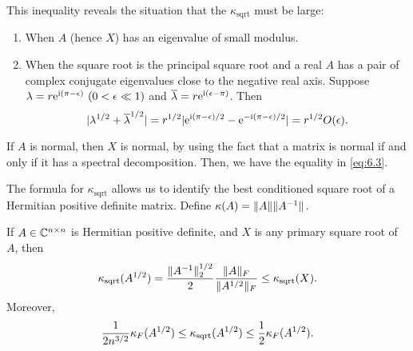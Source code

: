 \documentclass{article}
\begin{document}
This inequality reveals the situation that the $\kappa_{\mathrm{sqrt}}$
must be large:
\begin{enumerate}
\item When $A$ (hence $X$) has an eigenvalue of small modulus.
\item When the square root is the principal square root and a real $A$ has
  a pair of complex conjugate eigenvalues close to the negative real axis.
  Suppose $\lambda = r\mathrm{e}^{\mathrm{i}(\pi - \epsilon)}\ (0<\epsilon\ll 1)$ and
  $\overline \lambda = r\mathrm{e}^{\mathrm{i}(\epsilon - \pi)}$. Then
  \begin{equation}\label{eq:6.3}
    |\lambda^{1/2} + \overline\lambda^{1/2}| =
    r^{1/2}|\mathrm{e}^{\mathrm{i}(\pi-\epsilon)/2} - \mathrm{e}^{-\mathrm{i}(\pi-\epsilon)/2}| =
    r^{1/2}O(\epsilon). 
  \end{equation}
\end{enumerate}

If $A$ is normal, then $X$ is normal, by using the fact that a matrix is
normal if and only if it has a spectral decomposition. Then, we have the
equality in \eqref{eq:6.3}.

The formula for $\kappa_{\mathrm{sqrt}}$ allows us to identify the best
conditioned square root of a Hermitian positive definite matrix. Define
$\kappa(A) = \|{A}\|\|{A^{-1}}\|$.

\begin{lemma}
  If $A\in\mathbb{C}^{n\times n}$ is Hermitian positive definite, and $X$ is any primary
  square root of $A$, then
  \begin{equation}\notag
    \kappa_{\mathrm{sqrt}}(A^{1/2}) =
    \frac{\|{A^{-1}}\|_2^{1/2}}{2}\frac{\|{A}\|_F}{\|{A^{1/2}}\|_F} \leq
    \kappa_{\mathrm{sqrt}}(X). 
  \end{equation}
  Moreover,
  \begin{equation}\notag
    \frac{1}{2n^{3/2}}\kappa_F(A^{1/2}) \leq
    \kappa_{\mathrm{sqrt}}(A^{1/2}) \leq \frac{1}{2}\kappa_F(A^{1/2}). 
  \end{equation}
\end{lemma}
\end{document}
